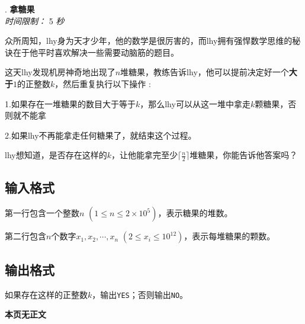 \addtocounter{ProblemNo}{1}
\renewcommand{\ProblemName}{拿糖果}
\begin{center}
\huge{. \textbf{\ProblemName}} \\ [0.8cm]
\large{\textit{时间限制：} 5 \textit{秒}} \\ [1cm]
\end{center}

众所周知，lhy身为天才少年，他的数学是很厉害的，而lhy拥有强悍数学思维的秘诀在于他平时喜欢解决一些需要动脑筋的题目。

这天lhy发现机房神奇地出现了$n$堆糖果，教练告诉lhy，他可以提前决定好一个\textbf{大于}$1$的正整数$k$，然后重复执行以下操作 : 

1.如果存在一堆糖果的数目大于等于$k$，那么lhy可以从这一堆中拿走$k$颗糖果，否则就不能拿

2.如果lhy不再能拿走任何糖果了，就结束这个过程。

lhy想知道，是否存在这样的$k$，让他能拿完至少$\lceil \frac{n}{2} \rceil$堆糖果，你能告诉他答案吗？

\subsection*{输入格式}

第一行包含一个整数$n$ $(1 \leq n \leq 2 \times 10^5)$，表示糖果的堆数。

第二行包含$n$个数字$x_1, x_2, \cdots, x_n$ $(2 \leq x_i \leq 10^{12})$，表示每堆糖果的颗数。

\subsection*{输出格式}

如果存在这样的正整数$k$，输出\texttt{YES}；否则输出\texttt{NO}。

\setcounter{ExampleNo}{0}


\clearpage

\ifodd\value{page}
\else
    \vspace*{\fill}
    \begin{center}
    \textbf{\Large 本页无正文}
    \end{center}
    \vspace*{\fill}
    \clearpage
\fi



